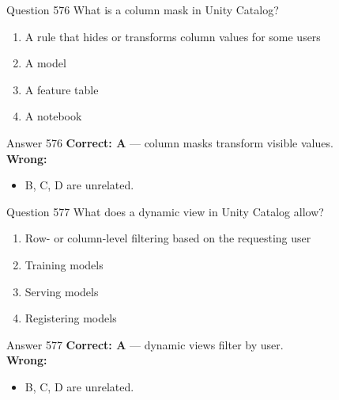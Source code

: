 \documentclass[aspectratio=169,11pt]{beamer}
\begin{document}
	\begin{frame}{Question 576}
		What is a column mask in Unity Catalog?
		\begin{enumerate}[label=\Alph*.]
			\item A rule that hides or transforms column values for some users
			\item A model
			\item A feature table
			\item A notebook
		\end{enumerate}
	\end{frame}
	\begin{frame}{Answer 576}
		\textbf{Correct: A} --- column masks transform visible values.\\
		\vspace{0.5em}
		\textbf{Wrong:}
		\begin{itemize}
			\item B, C, D are unrelated.
		\end{itemize}
	\end{frame}
	
	\begin{frame}{Question 577}
		What does a dynamic view in Unity Catalog allow?
		\begin{enumerate}[label=\Alph*.]
			\item Row- or column-level filtering based on the requesting user
			\item Training models
			\item Serving models
			\item Registering models
		\end{enumerate}
	\end{frame}
	\begin{frame}{Answer 577}
		\textbf{Correct: A} --- dynamic views filter by user.\\
		\vspace{0.5em}
		\textbf{Wrong:}
		\begin{itemize}
			\item B, C, D are unrelated.
		\end{itemize}
	\end{frame}
	
\end{document}
